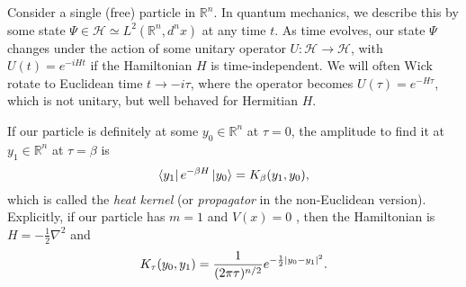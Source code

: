 Consider a single (free) particle in $\mathbb{R}^n$. 
In quantum mechanics, we describe this by some state $\Psi \in \mathscr{H} \simeq L^2(\mathbb{R}^n, d^n x)$ at any time $t$.
As time evolves, our state $\Psi$ changes under the action of some unitary operator $U \colon \mathscr{H} \to \mathscr{H}$, with $U(t) = e^{-i H t}$ if the Hamiltonian $H$ is time-independent.
We will often Wick rotate to Euclidean time $t \to -i \tau$, where the operator becomes $U(\tau) = e^{- H \tau}$, which is not unitary, but well behaved for Hermitian $H$.

If our particle is definitely at some $y_0 \in \mathbb{R}^n$  at $\tau = 0$, the amplitude to find it at  $y_1 \in \mathbb{R}^n$  at $\tau = \beta$ is
 \begin{equation}
  \bra{y_1} e^{-\beta H} \ket{y_0} = K_{\beta}(y_1, y_0),
\end{equation}
which is called the \emph{heat kernel} (or \emph{propagator} in the non-Euclidean version).
Explicitly, if our particle has $m = 1$  and $V(x) = 0$ , then the Hamiltonian is $H = -\frac{1}{2} \nabla^2$  and
\begin{equation}
  K_\tau (y_0, y_1) = \frac{1}{(2 \pi \tau)^{n / 2}} e^{-\frac{1}{2} \abs{y_0 - y_1}^2}.
\end{equation}

